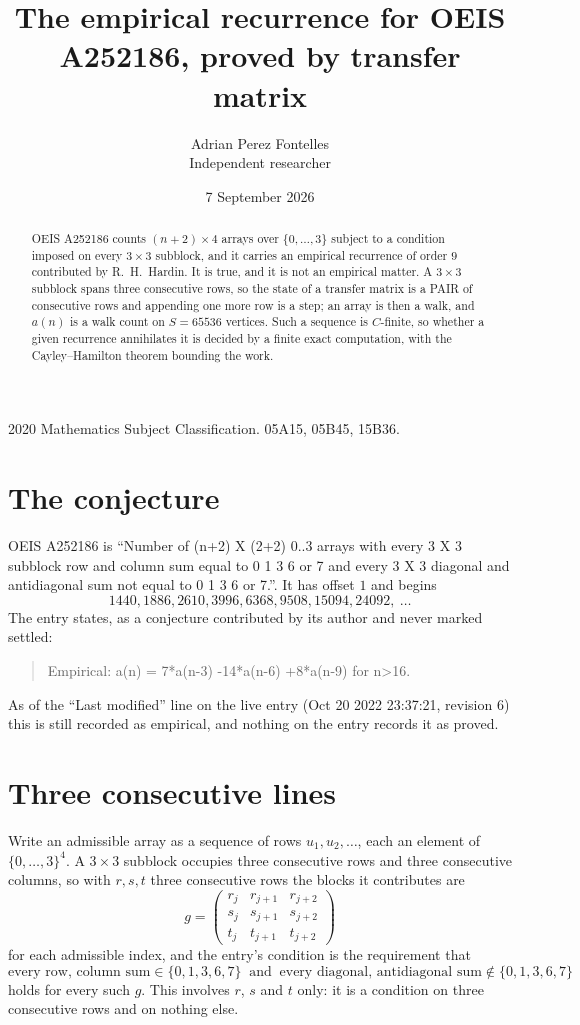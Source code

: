 \documentclass[11pt,a4paper]{article}
\title{The empirical recurrence for OEIS A252186, proved by transfer matrix}
\author{Adrian Perez Fontelles\\ \small Independent researcher}
\date{7 September 2026}
\theoremstyle{plain}
\theoremstyle{definition}
\begin{document}
\maketitle

\begin{abstract}
OEIS A252186 counts $(n+2)\times4$ arrays over $\{0,\dots,3\}$ subject to a condition imposed on
every $3\times3$ subblock, and it carries an empirical recurrence of order $9$
contributed by R.~H.~Hardin. It is true, and it is not an empirical matter. A $3\times3$
subblock spans three consecutive rows, so the state of a transfer matrix is a PAIR of
consecutive rows and appending one more row is a step; an array is then a walk, and
$a(n)$ is a walk count on $S=65536$ vertices. Such a sequence is $C$-finite, so whether a given
recurrence annihilates it is decided by a finite exact computation, with the Cayley--Hamilton
theorem bounding the work.
\end{abstract}

\noindent\small 2020 Mathematics Subject Classification. 05A15, 05B45, 15B36.\normalsize

\section{The conjecture}

OEIS A252186 is ``Number of (n+2) X (2+2) 0..3 arrays with every 3 X 3 subblock row and column sum equal to 0 1 3 6 or 7 and every 3 X 3 diagonal and antidiagonal sum not equal to 0 1 3 6 or 7.''. It has offset $1$ and begins
\[
1440, 1886, 2610, 3996, 6368, 9508, 15094, 24092,\ \dots
\]
The entry states, as a conjecture contributed by its author and never marked settled:
\begin{quote}
Empirical: a(n) = 7*a(n-3) -14*a(n-6) +8*a(n-9) for n>16.
\end{quote}
As of the ``Last modified'' line on the live entry (Oct 20 2022 23:37:21, revision 6) this is still
recorded as empirical, and nothing on the entry records it as proved.

\section{Three consecutive lines}

Write an admissible array as a sequence of rows $u_1,u_2,\dots$, each an element of
$\{0,\dots,3\}^{4}$. A $3\times3$ subblock occupies three consecutive rows and
three consecutive columns, so with $r,s,t$ three consecutive rows the blocks it
contributes are
\[
g=\begin{pmatrix}r_j&r_{j+1}&r_{j+2}\\ s_j&s_{j+1}&s_{j+2}\\ t_j&t_{j+1}&t_{j+2}\end{pmatrix}
\]
for each admissible index, and the entry's condition is the requirement that
\[
\text{every row, column sum} \in \{0,1,3,6,7\}\ \text{ and }\ \text{every diagonal, antidiagonal sum} \notin \{0,1,3,6,7\}
\]
holds for every such $g$. This involves $r$, $s$ and $t$ only: it is a condition on
three consecutive rows and on nothing else.
\end{document}
